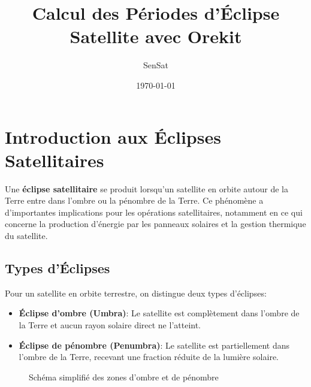 \documentclass[12pt,a4paper]{article}
\title{Calcul des Périodes d'Éclipse Satellite avec Orekit}
\author{SenSat}
\date{\today}
\begin{document}
\maketitle

\tableofcontents
\newpage

\section{Introduction aux Éclipses Satellitaires}

Une \textbf{éclipse satellitaire} se produit lorsqu'un satellite en orbite autour de la Terre entre dans l'ombre ou la pénombre de la Terre. Ce phénomène a d'importantes implications pour les opérations satellitaires, notamment en ce qui concerne la production d'énergie par les panneaux solaires et la gestion thermique du satellite.

\subsection{Types d'Éclipses}

Pour un satellite en orbite terrestre, on distingue deux types d'éclipses:

\begin{itemize}
    \item \textbf{Éclipse d'ombre (Umbra)}: Le satellite est complètement dans l'ombre de la Terre et aucun rayon solaire direct ne l'atteint.
    \item \textbf{Éclipse de pénombre (Penumbra)}: Le satellite est partiellement dans l'ombre de la Terre, recevant une fraction réduite de la lumière solaire.
\end{itemize}

\begin{figure}[H]
    \centering
    \caption{Schéma simplifié des zones d'ombre et de pénombre}
    \label{fig:eclipse_schema}
\end{figure}
\end{document}
